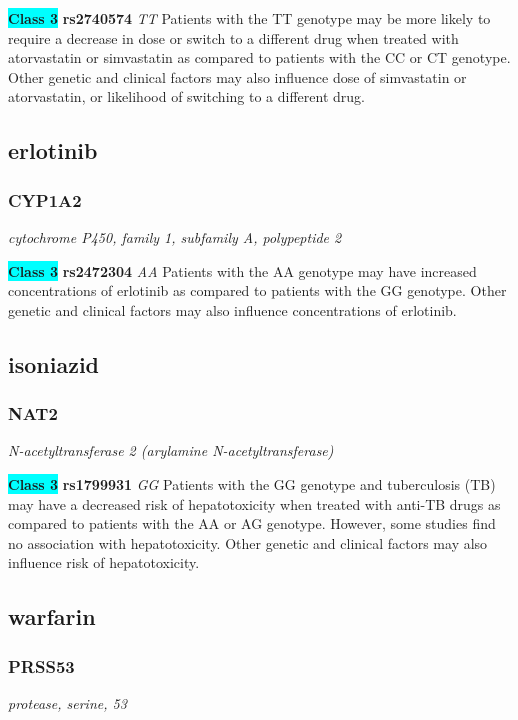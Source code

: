 \documentclass{report}
\begin{document}
\textbf{\colorbox{cyan} {Class 3}} \textbf{ rs2740574 } \textit{ TT }
Patients with the TT genotype may be more likely to require a decrease in dose or switch to a different drug when treated with atorvastatin or simvastatin as compared to patients with the CC or CT genotype. Other genetic and clinical factors may also influence dose of simvastatin or atorvastatin, or likelihood of switching to a different drug.\newline\subsection{ erlotinib }\subsubsection{ CYP1A2 }
\textit{ cytochrome P450, family 1, subfamily A, polypeptide 2 }

\textbf{\colorbox{cyan} {Class 3}} \textbf{ rs2472304 } \textit{ AA }
Patients with the AA genotype may have increased concentrations of erlotinib as compared to patients with the GG genotype. Other genetic and clinical factors may also influence concentrations of erlotinib.\newline\subsection{ isoniazid }\subsubsection{ NAT2 }
\textit{ N-acetyltransferase 2 (arylamine N-acetyltransferase) }

\textbf{\colorbox{cyan} {Class 3}} \textbf{ rs1799931 } \textit{ GG }
Patients with the GG genotype and tuberculosis (TB) may have a decreased risk of hepatotoxicity when treated with anti-TB drugs as compared to patients with the AA or AG genotype. However, some studies find no association with hepatotoxicity. Other genetic and clinical factors may also influence risk of hepatotoxicity.\newline\subsection{ warfarin }\subsubsection{ PRSS53 }
\textit{ protease, serine, 53 }
\end{document}
